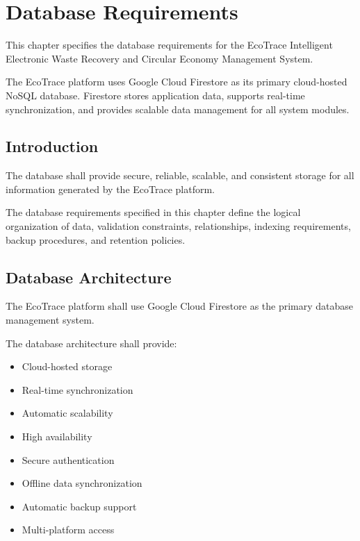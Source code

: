 \chapter{Database Requirements}
\label{chap:database-requirements}

This chapter specifies the database requirements for the EcoTrace
Intelligent Electronic Waste Recovery and Circular Economy Management
System.

The EcoTrace platform uses Google Cloud Firestore as its primary
cloud-hosted NoSQL database. Firestore stores application data,
supports real-time synchronization, and provides scalable data
management for all system modules.


\section{Introduction}
\label{sec:database-introduction}

The database shall provide secure, reliable, scalable, and consistent
storage for all information generated by the EcoTrace platform.

The database requirements specified in this chapter define the logical
organization of data, validation constraints, relationships, indexing
requirements, backup procedures, and retention policies.

\section{Database Architecture}
\label{sec:database-architecture}

The EcoTrace platform shall use Google Cloud Firestore as the primary
database management system.

The database architecture shall provide:

\begin{itemize}

\item Cloud-hosted storage

\item Real-time synchronization

\item Automatic scalability

\item High availability

\item Secure authentication

\item Offline data synchronization

\item Automatic backup support

\item Multi-platform access

\end{itemize}

